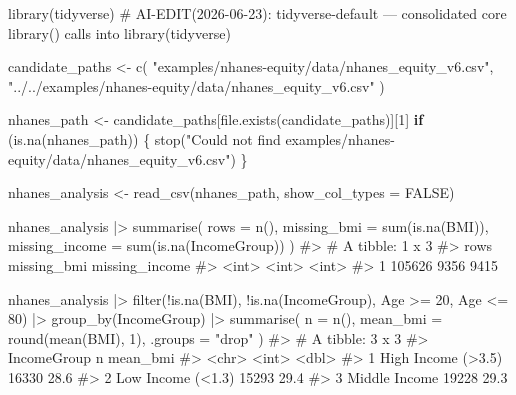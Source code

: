 \documentclass[
  letterpaper,
  DIV=11,
  numbers=noendperiod,
  oneside]{scrreprt}
\newenvironment{Shaded}{\begin{snugshade}}{\end{snugshade}}
\newcommand{\AttributeTok}[1]{\textcolor[rgb]{0.40,0.45,0.13}{#1}}
\newcommand{\CommentTok}[1]{\textcolor[rgb]{0.37,0.37,0.37}{#1}}
\newcommand{\ConstantTok}[1]{\textcolor[rgb]{0.56,0.35,0.01}{#1}}
\newcommand{\ControlFlowTok}[1]{\textcolor[rgb]{0.00,0.23,0.31}{\textbf{#1}}}
\newcommand{\DecValTok}[1]{\textcolor[rgb]{0.68,0.00,0.00}{#1}}
\newcommand{\FunctionTok}[1]{\textcolor[rgb]{0.28,0.35,0.67}{#1}}
\newcommand{\NormalTok}[1]{\textcolor[rgb]{0.00,0.23,0.31}{#1}}
\newcommand{\OtherTok}[1]{\textcolor[rgb]{0.00,0.23,0.31}{#1}}
\newcommand{\SpecialCharTok}[1]{\textcolor[rgb]{0.37,0.37,0.37}{#1}}
\newcommand{\StringTok}[1]{\textcolor[rgb]{0.13,0.47,0.30}{#1}}
\begin{document}
\begin{Shaded}
\begin{Highlighting}[numbers=left,,]
\FunctionTok{library}\NormalTok{(tidyverse) }\CommentTok{\# AI{-}EDIT(2026{-}06{-}23): tidyverse{-}default — consolidated core library() calls into library(tidyverse)}

\NormalTok{candidate\_paths }\OtherTok{\textless{}{-}} \FunctionTok{c}\NormalTok{(}
  \StringTok{"examples/nhanes{-}equity/data/nhanes\_equity\_v6.csv"}\NormalTok{,}
  \StringTok{"../../examples/nhanes{-}equity/data/nhanes\_equity\_v6.csv"}
\NormalTok{)}

\NormalTok{nhanes\_path }\OtherTok{\textless{}{-}}\NormalTok{ candidate\_paths[}\FunctionTok{file.exists}\NormalTok{(candidate\_paths)][}\DecValTok{1}\NormalTok{]}
\ControlFlowTok{if}\NormalTok{ (}\FunctionTok{is.na}\NormalTok{(nhanes\_path)) \{}
  \FunctionTok{stop}\NormalTok{(}\StringTok{"Could not find examples/nhanes{-}equity/data/nhanes\_equity\_v6.csv"}\NormalTok{)}
\NormalTok{\}}

\NormalTok{nhanes\_analysis }\OtherTok{\textless{}{-}} \FunctionTok{read\_csv}\NormalTok{(nhanes\_path, }\AttributeTok{show\_col\_types =} \ConstantTok{FALSE}\NormalTok{)}

\NormalTok{nhanes\_analysis }\SpecialCharTok{|\textgreater{}}
  \FunctionTok{summarise}\NormalTok{(}
    \AttributeTok{rows =} \FunctionTok{n}\NormalTok{(),}
    \AttributeTok{missing\_bmi =} \FunctionTok{sum}\NormalTok{(}\FunctionTok{is.na}\NormalTok{(BMI)),}
    \AttributeTok{missing\_income =} \FunctionTok{sum}\NormalTok{(}\FunctionTok{is.na}\NormalTok{(IncomeGroup))}
\NormalTok{  )}
\CommentTok{\#\textgreater{} \# A tibble: 1 x 3}
\CommentTok{\#\textgreater{}     rows missing\_bmi missing\_income}
\CommentTok{\#\textgreater{}    \textless{}int\textgreater{}       \textless{}int\textgreater{}          \textless{}int\textgreater{}}
\CommentTok{\#\textgreater{} 1 105626        9356           9415}

\NormalTok{nhanes\_analysis }\SpecialCharTok{|\textgreater{}}
  \FunctionTok{filter}\NormalTok{(}\SpecialCharTok{!}\FunctionTok{is.na}\NormalTok{(BMI), }\SpecialCharTok{!}\FunctionTok{is.na}\NormalTok{(IncomeGroup), Age }\SpecialCharTok{\textgreater{}=} \DecValTok{20}\NormalTok{, Age }\SpecialCharTok{\textless{}=} \DecValTok{80}\NormalTok{) }\SpecialCharTok{|\textgreater{}}
  \FunctionTok{group\_by}\NormalTok{(IncomeGroup) }\SpecialCharTok{|\textgreater{}}
  \FunctionTok{summarise}\NormalTok{(}
    \AttributeTok{n =} \FunctionTok{n}\NormalTok{(),}
    \AttributeTok{mean\_bmi =} \FunctionTok{round}\NormalTok{(}\FunctionTok{mean}\NormalTok{(BMI), }\DecValTok{1}\NormalTok{),}
    \AttributeTok{.groups =} \StringTok{"drop"}
\NormalTok{  )}
\CommentTok{\#\textgreater{} \# A tibble: 3 x 3}
\CommentTok{\#\textgreater{}   IncomeGroup            n mean\_bmi}
\CommentTok{\#\textgreater{}   \textless{}chr\textgreater{}              \textless{}int\textgreater{}    \textless{}dbl\textgreater{}}
\CommentTok{\#\textgreater{} 1 High Income (\textgreater{}3.5) 16330     28.6}
\CommentTok{\#\textgreater{} 2 Low Income (\textless{}1.3)  15293     29.4}
\CommentTok{\#\textgreater{} 3 Middle Income      19228     29.3}
\end{Highlighting}
\end{Shaded}
\end{document}
